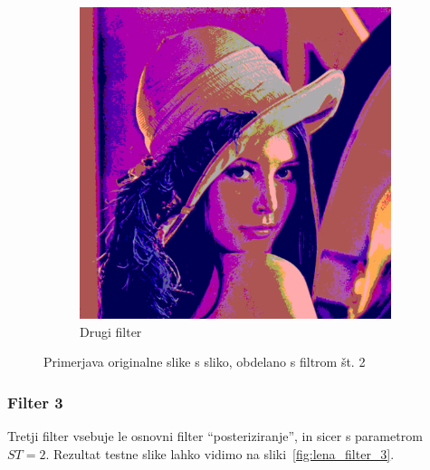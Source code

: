 \documentclass[a4paper, 12pt]{book}
\begin{document}
\begin{figure}[!ht]
\begin{subfigure}[b]{0.4\textwidth}
        \includegraphics[width=\textwidth]{lena_filter_2}
        \caption{Drugi filter}
    \end{subfigure}
    \caption{Primerjava originalne slike s sliko, obdelano s filtrom št. 2}
    \label{fig:lena_filter_2}
\end{figure}


\subsubsection*{Filter 3}
Tretji filter vsebuje le osnovni filter ``posteriziranje'', in sicer s parametrom
$ST = 2$. Rezultat testne slike lahko vidimo na sliki~\ref{fig:lena_filter_3}.
\end{document}
